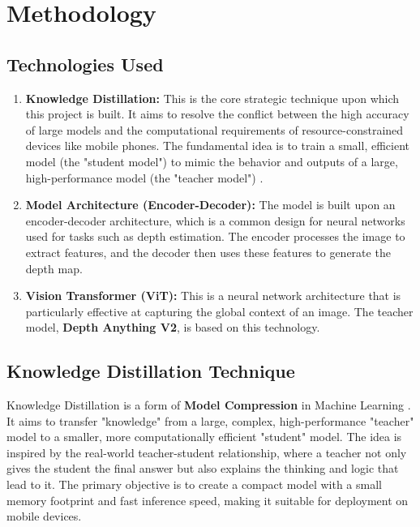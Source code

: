\chapter{Methodology}
\label{chap:methodology}

\section{Technologies Used}
\label{sec:technologies_used}

\begin{enumerate}
    \item \textbf{Knowledge Distillation:} This is the core strategic technique upon which this project is built. It aims to resolve the conflict between the high accuracy of large models and the computational requirements of resource-constrained devices like mobile phones. The fundamental idea is to train a small, efficient model (the "student model") to mimic the behavior and outputs of a large, high-performance model (the "teacher model") \cite{hu2023teacher}.
    \item \textbf{Model Architecture (Encoder-Decoder):} The model is built upon an encoder-decoder architecture, which is a common design for neural networks used for tasks such as depth estimation. The encoder processes the image to extract features, and the decoder then uses these features to generate the depth map.
    \item \textbf{Vision Transformer (ViT):} This is a neural network architecture that is particularly effective at capturing the global context of an image. The teacher model, \textbf{Depth Anything V2}, is based on this technology.
\end{enumerate}

\section{Knowledge Distillation Technique}
\label{sec:kd_technique}

Knowledge Distillation is a form of \textbf{Model Compression} in Machine Learning \cite{hinton2015distilling}. It aims to transfer "knowledge" from a large, complex, high-performance "teacher" model to a smaller, more computationally efficient "student" model. The idea is inspired by the real-world teacher-student relationship, where a teacher not only gives the student the final answer but also explains the thinking and logic that lead to it. The primary objective is to create a compact model with a small memory footprint and fast inference speed, making it suitable for deployment on mobile devices.

